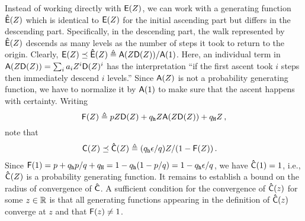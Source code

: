   Instead of working directly with $\mathsf{E}(Z)$, 
  we can work with a generating function $\mathsf{\hat{E}}(Z)$ 
  which is identical to $\mathsf{E}(Z)$ for the initial ascending part 
  but differs in the descending part. 
  Specifically, in the descending part, 
  the walk represented by $\mathsf{\hat{E}}(Z)$ descends as many levels 
  as the number of steps it took to return to the origin. 
  Clearly, $
      \mathsf{E}(Z) \preceq \mathsf{\hat{E}}(Z) \triangleq \mathsf{A}(Z \mathsf{D}(Z) )/\mathsf{A}(1)
  $. 
  Here, an individual term in $\mathsf{A}(Z \mathsf{D}(Z)) = \sum_i a_i Z^i \mathsf{D}(Z)^i$ 
  has the interpretation 
  ``if the first ascent took $i$ steps then immediately descend $i$ levels.''
  Since $\mathsf{A}(Z)$ is not a probability generating function, 
  we have to normalize it by $\mathsf{A}(1)$ to make sure that 
  the ascent happens with certainty. 
  Writing 
  \[
    \mathsf{F}(Z) \triangleq pZ \mathsf{D}(Z) + q_{\mathtt{h}}  Z \mathsf{A}(Z \mathsf{D}(Z) ) + q_{\mathtt{H}} Z
    \,,
  \]
  note that 
  \begin{align}
    &\mathsf{C}(Z) 
        \preceq \mathsf{\hat{C}}(Z) 
        \triangleq 
        (q_{\mathtt{h}} \epsilon/q) Z/(1 - \mathsf{F}(Z) )
    \,. \label{eq:gfChat}
  \end{align}
  Since $\mathsf{F}(1) = p + q_{\mathtt{h}} p/q + q_{\mathtt{H}} = 1 - q_{\mathtt{h}}(1 - p/q) = 1 - q_{\mathtt{h}} \epsilon/q$, 
  we have $\mathsf{\hat{C}}(1) = 1$, i.e.,  
  $\mathsf{\hat{C}}(Z)$ is a probability generating function. 
  It remains to establish a bound on the radius of convergence of
  $\mathsf{\hat{C}}$. 
  A sufficient condition for the convergence of
  $\mathsf{\hat{C}}(z)$ for some $z \in \mathbb{R}$ is 
  that all generating functions appearing in the definition of
  $\mathsf{\hat{C}}(z)$ converge at $z$ and 
  that $\mathsf{F}(z) \neq 1$. 


